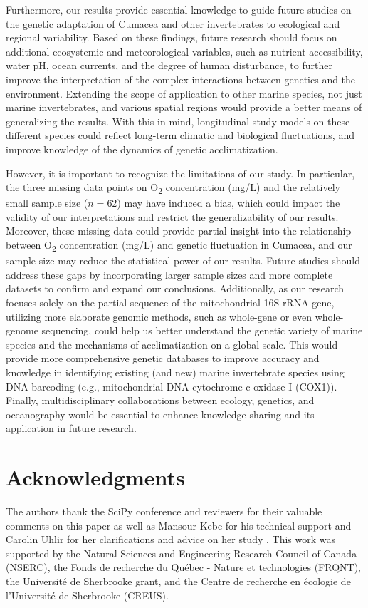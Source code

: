 Furthermore, our results provide essential knowledge to guide future studies on the genetic adaptation of Cumacea and other invertebrates to ecological and regional variability. Based on these findings, future research should focus on additional ecosystemic and meteorological variables, such as nutrient accessibility, water pH, ocean currents, and the degree of human disturbance, to further improve the interpretation of the complex interactions between genetics and the environment. Extending the scope of application to other marine species, not just marine invertebrates, and various spatial regions would provide a better means of generalizing the results. With this in mind, longitudinal study models on these different species could reflect long-term climatic and biological fluctuations, and improve knowledge of the dynamics of genetic acclimatization.

However, it is important to recognize the limitations of our study. In particular, the three missing data points on O\textsubscript{2} concentration (mg/L) and the relatively small sample size ($n=62$) may have induced a bias, which could impact the validity of our interpretations and restrict the generalizability of our results. Moreover, these missing data could provide partial insight into the relationship between O\textsubscript{2} concentration (mg/L) and genetic fluctuation in Cumacea, and our sample size may reduce the statistical power of our results. Future studies should address these gaps by incorporating larger sample sizes and more complete datasets to confirm and expand our conclusions. Additionally, as our research focuses solely on the partial sequence of the mitochondrial 16S rRNA gene, utilizing more elaborate genomic methods, such as whole-gene or even whole-genome sequencing, could help us better understand the genetic variety of marine species and the mechanisms of acclimatization on a global scale. This would provide more comprehensive genetic databases to improve accuracy and knowledge in identifying existing (and new) marine invertebrate species using DNA barcoding (e.g., mitochondrial DNA cytochrome c oxidase I (COX1)). Finally, multidisciplinary collaborations between ecology, genetics, and oceanography would be essential to enhance knowledge sharing and its application in future research.

\section{Acknowledgments}\label{acknowledgments}
The authors thank the SciPy conference and reviewers for their valuable comments on this paper as well as Mansour Kebe for his technical support and Carolin Uhlir for her clarifications and advice on her study \citep{uhlir_adding_2021}. This work was supported by the Natural Sciences and Engineering Research Council of Canada (NSERC), the Fonds de recherche du Québec - Nature et technologies (FRQNT), the Université de Sherbrooke grant, and the Centre de recherche en écologie de l’Université de Sherbrooke (CREUS).
